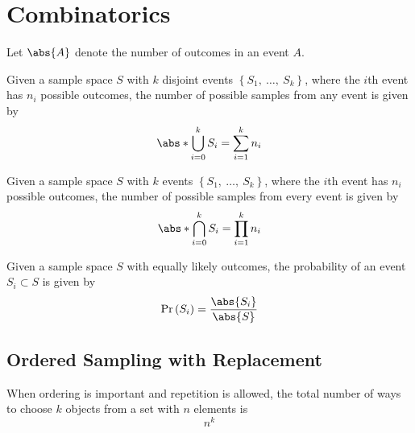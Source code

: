 \documentclass{article}
\begin{document}
\section{Combinatorics}
\begin{definition}
    Let \(\abs{A}\) denote the number of outcomes in an event \(A\).
\end{definition}
\begin{theorem}
    Given a sample space \(S\) with \(k\) disjoint events \({\left\{ S_1,\:\ldots,\:S_k \right\}}\),
    where the \(i\)th event has \(n_i\) possible outcomes,
    the number of possible samples from any event is given by
    \begin{equation*}
        \abs*{\bigcup_{i = 0}^{k} S_i} = \sum_{i = 1}^k n_i
    \end{equation*}
\end{theorem}
\begin{theorem}
    Given a sample space \(S\) with \(k\) events \({\left\{ S_1,\:\ldots,\:S_k \right\}}\),
    where the \(i\)th event has \(n_i\) possible outcomes,
    the number of possible samples from every event is given by
    \begin{equation*}
        \abs*{\bigcap_{i=0}^{k} S_i} = \prod_{i = 1}^k n_i
    \end{equation*}
\end{theorem}
\begin{theorem}
    Given a sample space \(S\) with equally likely outcomes, the probability
    of an event \(S_i \subset S\) is given by
    \begin{equation*}
        \Pr{\left( S_i \right)} = \frac{\abs{S_i}}{\abs{S}}
    \end{equation*}
\end{theorem}
\subsection{Ordered Sampling with Replacement}
When ordering is important and repetition is allowed,
the total number of ways to choose \(k\) objects from a set with \(n\) elements is
\begin{equation*}
    n^k
\end{equation*}
\end{document}
